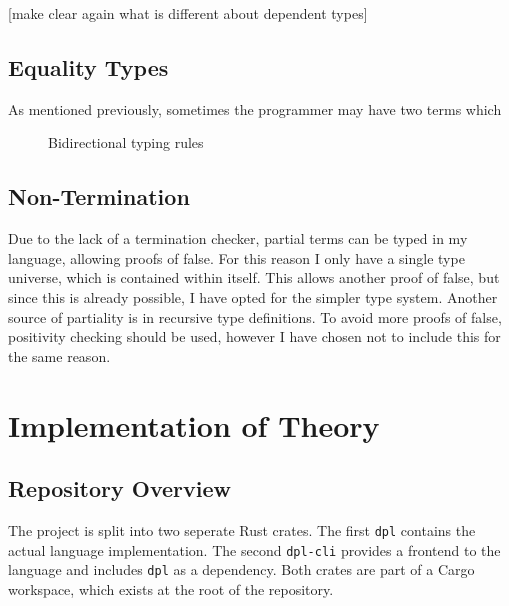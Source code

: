 \documentclass[12pt,a4paper,twoside]{report}
\begin{document}
[make clear again what is different about dependent types]

\subsection{Equality Types}

As mentioned previously, sometimes the programmer may have two terms which 

\begin{figure}
    \caption{Bidirectional typing rules}
    \label{rules}
\end{figure}

\subsection{Non-Termination}

Due to the lack of a termination checker, partial terms can be typed in my language, allowing proofs of false. For this reason I only have a single type universe, which is contained within itself. This allows another proof of false, but since this is already possible, I have opted for the simpler type system. Another source of partiality is in recursive type definitions. To avoid more proofs of false, positivity checking should be used, however I have chosen not to include this for the same reason.

\section{Implementation of Theory}

\subsection{Repository Overview}

The project is split into two seperate Rust crates. The first \texttt{dpl} contains the actual language implementation. The second \texttt{dpl-cli} provides a frontend to the language and includes \texttt{dpl} as a dependency. Both crates are part of a Cargo workspace, which exists at the root of the repository.
\end{document}
